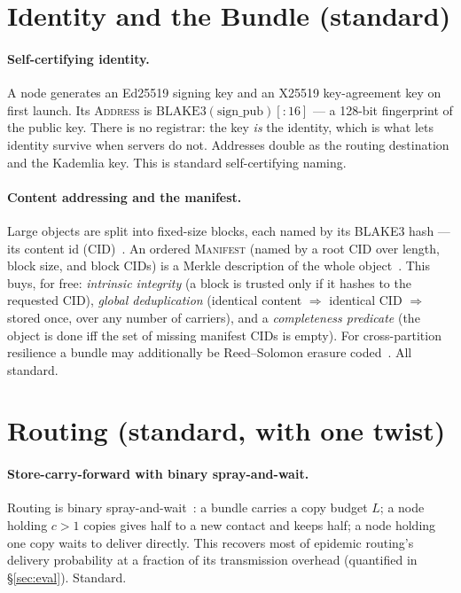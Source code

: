 \documentclass[11pt]{article}
\begin{document}
\section{Identity and the Bundle (standard)}\label{sec:bundle}

\paragraph{Self-certifying identity.} A node generates an Ed25519 signing key and
an X25519 key-agreement key on first launch. Its \textsc{Address} is
$\mathrm{BLAKE3}(\text{sign\_pub})[{:}16]$ --- a 128-bit fingerprint of the public
key. There is no registrar: the key \emph{is} the identity, which is what lets
identity survive when servers do not. Addresses double as the routing destination
and the Kademlia key. This is standard self-certifying naming.

\paragraph{Content addressing and the manifest.} Large objects are split into
fixed-size blocks, each named by its BLAKE3 hash --- its content id
(CID)~\cite{benet2014ipfs}. An ordered \textsc{Manifest} (named by a root CID over
length, block size, and block CIDs) is a Merkle description of the whole
object~\cite{merkle1987digsig}. This buys, for free: \emph{intrinsic integrity}
(a block is trusted only if it hashes to the requested CID), \emph{global
deduplication} (identical content $\Rightarrow$ identical CID $\Rightarrow$ stored
once, over any number of carriers), and a \emph{completeness predicate} (the
object is done iff the set of missing manifest CIDs is empty). For cross-partition
resilience a bundle may additionally be Reed--Solomon erasure
coded~\cite{reed1960polynomial}. All standard.

\section{Routing (standard, with one twist)}\label{sec:routing}

\paragraph{Store-carry-forward with binary spray-and-wait.} Routing is binary
spray-and-wait~\cite{spyropoulos2005sprayandwait}: a bundle carries a copy budget
$L$; a node holding $c>1$ copies gives half to a new contact and keeps half; a
node holding one copy waits to deliver directly. This recovers most of epidemic
routing's~\cite{vahdat2000epidemic} delivery probability at a fraction of its
transmission overhead (quantified in \S\ref{sec:eval}). Standard.
\end{document}
